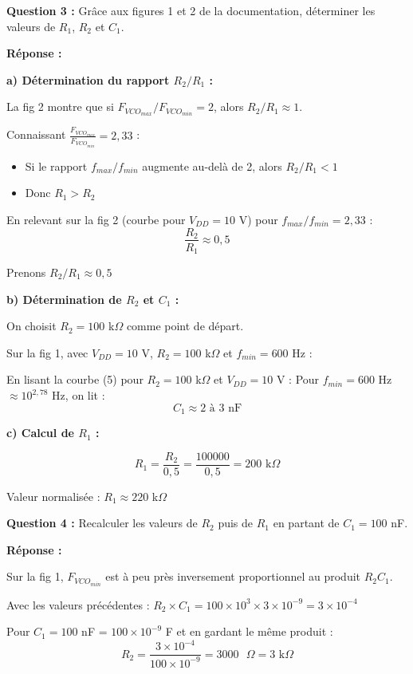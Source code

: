 \documentclass[a4paper,11pt]{article}
\begin{document}
\vspace{0.5cm}
\textbf{Question 3 :} Grâce aux figures 1 et 2 de la documentation, déterminer les valeurs de $R_1$, $R_2$ et $C_1$.

\vspace{0.3cm}
\textbf{Réponse :}

\textbf{a) Détermination du rapport $R_2/R_1$ :}

La fig 2 montre que si $F_{VCO_{max}}/F_{VCO_{min}} = 2$, alors $R_2/R_1 \approx 1$.

Connaissant $\frac{F_{VCO_{max}}}{F_{VCO_{min}}} = 2{,}33$ :
\begin{itemize}
    \item Si le rapport $f_{max}/f_{min}$ augmente au-delà de 2, alors $R_2/R_1 < 1$
    \item Donc $R_1 > R_2$
\end{itemize}

En relevant sur la fig 2 (courbe pour $V_{DD} = 10$ V) pour $f_{max}/f_{min} = 2{,}33$ :
\[
\frac{R_2}{R_1} \approx 0{,}5
\]

Prenons $\boxed{R_2/R_1 \approx 0{,}5}$

\textbf{b) Détermination de $R_2$ et $C_1$ :}

On choisit $R_2 = 100$ k$\Omega$ comme point de départ.

Sur la fig 1, avec $V_{DD} = 10$ V, $R_2 = 100$ k$\Omega$ et $f_{min} = 600$ Hz :

En lisant la courbe (5) pour $R_2 = 100$ k$\Omega$ et $V_{DD} = 10$ V :
Pour $f_{min} = 600$ Hz $\approx 10^{2{,}78}$ Hz, on lit :
\[
C_1 \approx 2 \text{ à } 3 \text{ nF}
\]

\textbf{c) Calcul de $R_1$ :}

\[
R_1 = \frac{R_2}{0{,}5} = \frac{100000}{0{,}5} = \boxed{200 \text{ k}\Omega}
\]

Valeur normalisée : $R_1 \approx 220$ k$\Omega$

\vspace{0.5cm}
\textbf{Question 4 :} Recalculer les valeurs de $R_2$ puis de $R_1$ en partant de $C_1 = 100$ nF.

\vspace{0.3cm}
\textbf{Réponse :}

Sur la fig 1, $F_{VCO_{min}}$ est à peu près inversement proportionnel au produit $R_2 C_1$.

Avec les valeurs précédentes : $R_2 \times C_1 = 100 \times 10^3 \times 3 \times 10^{-9} = 3 \times 10^{-4}$

Pour $C_1 = 100$ nF = $100 \times 10^{-9}$ F et en gardant le même produit :
\[
R_2 = \frac{3 \times 10^{-4}}{100 \times 10^{-9}} = 3000 \text{ }\Omega = 3 \text{ k}\Omega
\]
\end{document}
